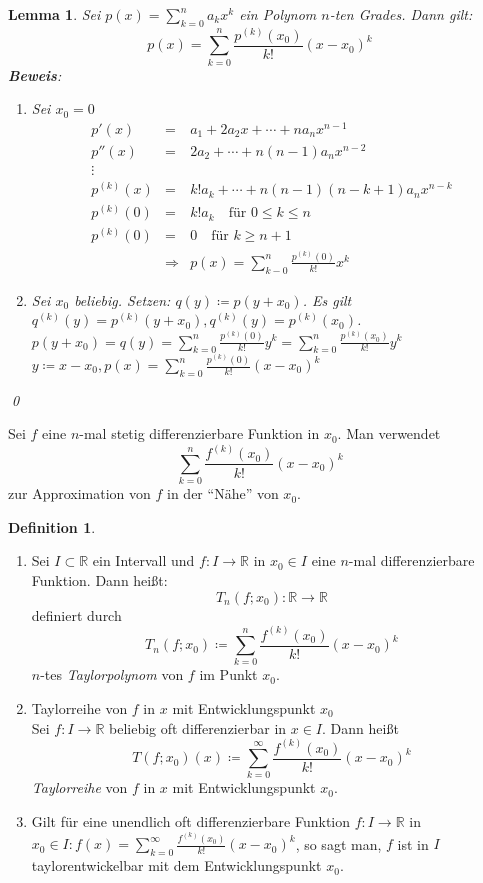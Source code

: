 \documentclass[ngerman,titlepage,twoside, parskip=half*]{scrreprt}
\newcommand*{\R}{\mathbb{R}}
\theoremstyle{plain}
\newtheorem{lemma}{Lemma}
\theoremstyle{definition}
\newtheorem{definition}{Definition}
\theoremstyle{remark}
\begin{document}
\begin{lemma}
  Sei $p(x)=\sum_{k=0}^n a_kx^k$ ein Polynom $n$-ten Grades. Dann gilt:
  \[p(x)=\sum_{k=0}^n \frac{p^{(k)}(x_0)}{k!} (x-x_0)^k\]
  \textbf{Beweis}:
  \begin{enumerate}[1. F{a}ll]
    \item Sei $x_0=0$
      \begin{align*}
	p'(x)&=& a_1+2a_2x+\cdots+na_nx^{n-1}\\
	p''(x)&=& 2a_2+\cdots+n(n-1)a_nx^{n-2}\\
	\vdots\\
	p^{(k)}(x)&=& k!a_k+\cdots+n(n-1)(n-k+1)a_nx^{n-k}\\
	p^{(k)}(0)&=& k!a_k \quad\text{für } 0\leq k\leq n\\
	p^{(k)}(0)&=& 0 \quad\text{für } k\geq n+1\\
	&\Rightarrow & p(x)=\sum_{k-0}^n \frac{p^{(k)}(0)}{k!}x^k
      \end{align*}
    \item Sei $x_0$ beliebig. Setzen: $q(y)\coloneqq p(y+x_0)$. Es gilt $q^{(k)}
      (y)=p^{(k)}(y+x_0), q^{(k)}(y)=p^{(k)}(x_0)$.\\
      $p(y+x_0)=q(y)=\sum_{k=0}^n \frac{p^{(k)}(0)}{k!}y^k=\sum_{k=0}^n
      \frac{p^{(k)}(x_0)}{k!}y^k$\\
      $y\coloneqq x-x_0, p(x)=\sum_{k=0}^n \frac{p^{(k)}(0)}{k!}(x-x_0)^k$
  \end{enumerate}
  \qed
\end{lemma}

Sei $f$ eine $n$-mal stetig differenzierbare Funktion in $x_0$. Man
verwendet 
\[\sum_{k=0}^n \frac{f^{(k)}(x_0)}{k!}(x-x_0)^k\]
zur Approximation von $f$ in der "`Nähe"' von $x_0$.

\begin{definition}
  \begin{enumerate}[(1)]
    \item Sei $I\subset\R$ ein Intervall und $f\colon I\rightarrow\R$ in $x_0
      \in I$ eine $n$-mal differenzierbare Funktion. Dann heißt:
      \[T_n(f;x_0)\colon\R\rightarrow\R\]
      definiert durch
      \[T_n(f;x_0)\coloneqq\sum_{k=0}^n \frac{f^{(k)}(x_0)}{k!}(x-x_0)^k\]
      $n$-tes \emph{Taylorpolynom} von $f$ im
      Punkt $x_0$.
    \item Taylorreihe von $f$ in $x$ mit Entwicklungspunkt $x_0$\\
      Sei $f\colon I\rightarrow\R$ beliebig oft differenzierbar in $x\in I$.
      Dann heißt
      \[T(f;x_0)(x)\coloneqq\sum_{k=0}^\infty \frac{f^{(k)}(x_0)}{k!}(x-x_0)^k\]
      \emph{Taylorreihe} von $f$ in $x$ mit
      Entwicklungspunkt $x_0$.
    \item Gilt für eine unendlich oft differenzierbare Funktion 
      $f\colon I\rightarrow\R$ in $x_0\in I\colon f(x)=\sum_{k=0}^\infty
      \frac{f^{(k)}(x_0)}{k!}(x-x_0)^k$, so sagt man, $f$ ist in $I$
      taylorentwickelbar mit dem Entwicklungspunkt $x_0$.
  \end{enumerate}
\end{definition}
\end{document}

